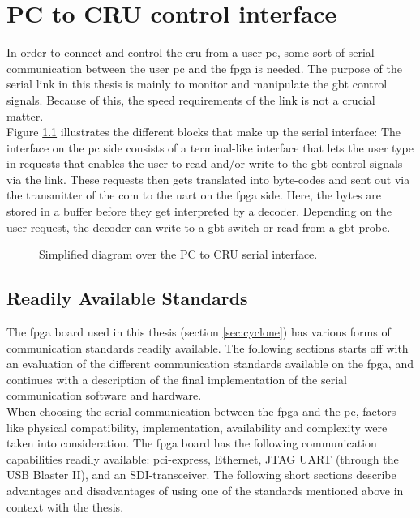 \documentclass[main.tex]{subfiles}
\begin{document}
\chapter{PC to CRU control interface} \label{chap:sercom}

In order to connect and control the \gls{cru} from a user \acrshort{pc}, some sort of serial communication between the user \acrshort{pc} and the \gls{fpga} is needed. The purpose of the serial link in this thesis is mainly to monitor and manipulate the \gls{gbt} control signals. Because of this, the speed requirements of the link is not a crucial matter. \\
Figure \ref{fig:sergui} illustrates the different blocks that make up the serial interface: The interface on the \acrshort{pc} side consists of a terminal-like interface that lets the user type in requests that enables the user to read and/or write to the \gls{gbt} control signals via the link. These requests then gets translated into byte-codes and sent out via the transmitter of the \gls{com} to the \gls{uart} on the fpga side. Here, the bytes are stored in a buffer before they get interpreted by a decoder. Depending on the user-request, the decoder can write to a \gls{gbt}-switch or read from a \gls{gbt}-probe.

\begin{figure}[H] %

\caption{Simplified diagram over the PC to CRU serial interface.}
\label{fig:sergui}
\end{figure}

\section{Readily Available Standards}
The \gls{fpga} board used in this thesis (section \ref{sec:cyclone}) has various forms of communication standards readily available. The following sections starts off with an evaluation of the different communication standards available on the \gls{fpga}, and continues with a description of the final implementation of the serial communication software and hardware.\\

When choosing the serial communication between the \gls{fpga} and the \acrshort{pc}, factors like physical compatibility, implementation, availability and complexity were taken into consideration. The \gls{fpga} board has the following communication capabilities readily available: \gls{pci}-express, Ethernet, JTAG UART (through the USB Blaster II), and an SDI-transceiver. The following short sections describe advantages and disadvantages of using one of the standards mentioned above in context with the thesis.
\end{document}

